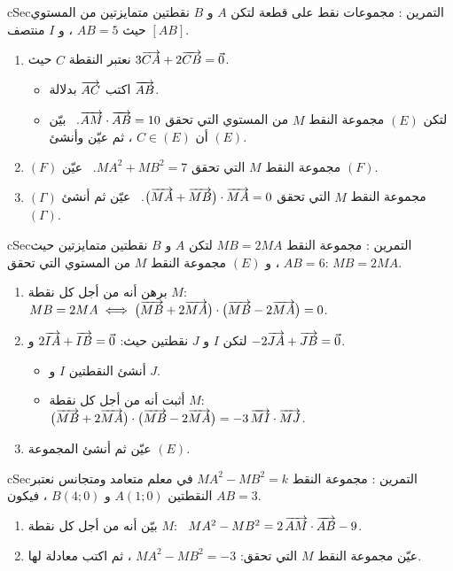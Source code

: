 \documentclass[12pt,a4paper]{article}
\newenvironment{BOX}[2]{\begin{otherlanguage}{english}\begin{arbox}{#1}{#2}}{\end{arbox}\end{otherlanguage}}
\newcounter{exo}
\newenvironment{tamrin}[1]{\stepcounter{exo}\begin{BOX}{cSec}{التمرين \theexo: #1}}{\end{BOX}}
\newenvironment{sq}{\begin{itemize}[leftmargin=2.4em,itemsep=3pt]}{\end{itemize}}
\newcommand{\qa}{\item[(أ)]}\newcommand{\qb}{\item[(ب)]}\newcommand{\qc}{\item[(جـ)]}\newcommand{\qd}{\item[(د)]}\newcommand{\qe}{\item[(هـ)]}
\begin{document}
\begin{tamrin}{مجموعات نقط على قطعة}
لتكن $A$ و $B$ نقطتين متمايزتين من المستوي حيث $AB=5$ ، و $I$ منتصف $[AB]$.
\begin{enumerate}
\item نعتبر النقطة $C$ حيث $3\overrightarrow{CA}+2\overrightarrow{CB}=\vec0$.
\begin{sq}
\qa اكتب $\overrightarrow{AC}$ بدلالة $\overrightarrow{AB}$.
\qb لتكن $(E)$ مجموعة النقط $M$ من المستوي التي تحقق $\overrightarrow{AM}\cdot\overrightarrow{AB}=10$. \ بيّن أن $C\in(E)$ ، ثم عيّن وأنشئ $(E)$.
\end{sq}
\item $(F)$ مجموعة النقط $M$ التي تحقق $MA^2+MB^2=7$. \ عيّن $(F)$.
\item $(\Gamma)$ مجموعة النقط $M$ التي تحقق $\big(\overrightarrow{MA}+\overrightarrow{MB}\big)\cdot\overrightarrow{MA}=0$. \ عيّن ثم أنشئ $(\Gamma)$.
\end{enumerate}
\end{tamrin}

\begin{tamrin}{مجموعة النقط $MB=2MA$}
لتكن $A$ و $B$ نقطتين متمايزتين حيث $AB=6$ ، و $(E)$ مجموعة النقط $M$ من المستوي التي تحقق: $MB=2MA$.
\begin{enumerate}
\item برهن أنه من أجل كل نقطة $M$: \ $MB=2MA\iff\big(\overrightarrow{MB}+2\overrightarrow{MA}\big)\cdot\big(\overrightarrow{MB}-2\overrightarrow{MA}\big)=0$.
\item لتكن $I$ و $J$ نقطتين حيث: $2\overrightarrow{IA}+\overrightarrow{IB}=\vec0$ و $-2\overrightarrow{JA}+\overrightarrow{JB}=\vec0$.
\begin{sq}
\qa أنشئ النقطتين $I$ و $J$.
\qb أثبت أنه من أجل كل نقطة $M$: \ $\big(\overrightarrow{MB}+2\overrightarrow{MA}\big)\cdot\big(\overrightarrow{MB}-2\overrightarrow{MA}\big)=-3\,\overrightarrow{MI}\cdot\overrightarrow{MJ}$.
\end{sq}
\item عيّن ثم أنشئ المجموعة $(E)$.
\end{enumerate}
\end{tamrin}

\begin{tamrin}{مجموعة النقط $MA^2-MB^2=k$}
في معلم متعامد ومتجانس نعتبر النقطتين $A(1;0)$ و $B(4;0)$ ، فيكون $AB=3$.
\begin{enumerate}
\item بيّن أنه من أجل كل نقطة $M$: \ $MA^2-MB^2=2\,\overrightarrow{AM}\cdot\overrightarrow{AB}-9$.
\item عيّن مجموعة النقط $M$ التي تحقق: $MA^2-MB^2=-3$ ، ثم اكتب معادلة لها.
\end{enumerate}
\end{tamrin}
\end{document}
